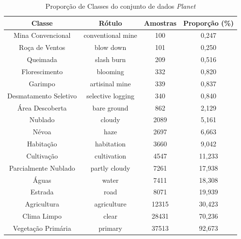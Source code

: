 \begin{table}[h!]
    \caption{Proporção de Classes do conjunto de dados \textit{Planet}}
    \centering
\begin{tabular}{*{4}{c}}
    \toprule
    Classe                  &            Rótulo &  Amostras      &  Proporção (\%) \\
    \midrule
    Mina Convencional       & conventional mine &        100     &       0,247 \\
    Roça de Ventos          &         blow down &        101     &       0,250 \\
    Queimada                &        slash burn &        209     &       0,516 \\
    Florescimento           &          blooming &        332     &       0,820 \\
    Garimpo                 &    artisinal mine &        339     &       0,837 \\
    Desmatamento Seletivo   & selective logging &        340     &       0,840 \\
    Área Descoberta         &       bare ground &        862     &       2,129 \\
    Nublado                 &            cloudy &       2089     &       5,161 \\
    Névoa                   &              haze &       2697     &       6,663 \\
    Habitação               &        habitation &       3660     &       9,042 \\
    Cultivação              &       cultivation &       4547     &      11,233 \\
    Parcialmente Nublado    &     partly cloudy &       7261     &      17,938 \\
    Águas                   &             water &       7411     &      18,308 \\
    Estrada                 &              road &       8071     &      19,939 \\
    Agricultura             &       agriculture &      12315     &      30,423 \\
    Clima Limpo             &             clear &      28431     &      70,236 \\
    Vegetação Primária      &           primary &      37513     &      92,673 \\
    \bottomrule
\end{tabular}
\label{table:proporcao_classes}
\end{table}




